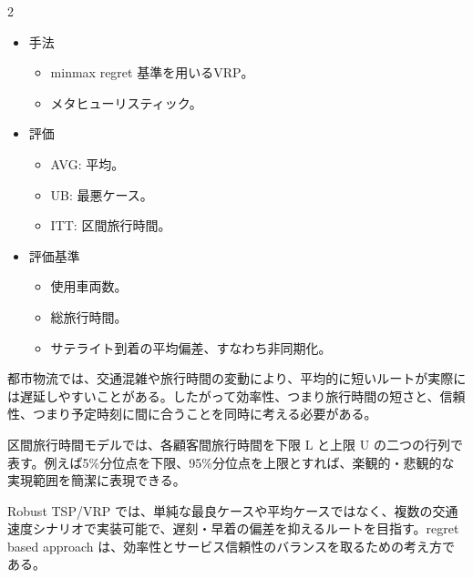 \clearpage



\vspace{1.5mm}

\begin{multicols}{2}

\footnotesize

\raggedcolumns


\begin{itemize}
\item 手法
\begin{itemize}
\item minmax regret 基準を用いるVRP。
\item メタヒューリスティック。
\end{itemize}
\item 評価
\begin{itemize}
\item AVG: 平均。
\item UB: 最悪ケース。
\item ITT: 区間旅行時間。
\end{itemize}
\item 評価基準
\begin{itemize}
\item 使用車両数。
\item 総旅行時間。
\item サテライト到着の平均偏差、すなわち非同期化。
\end{itemize}
\end{itemize}

都市物流では、交通混雑や旅行時間の変動により、平均的に短いルートが実際には遅延しやすいことがある。したがって効率性、つまり旅行時間の短さと、信頼性、つまり予定時刻に間に合うことを同時に考える必要がある。\par

区間旅行時間モデルでは、各顧客間旅行時間を下限 L と上限 U の二つの行列で表す。例えば5\%分位点を下限、95\%分位点を上限とすれば、楽観的・悲観的な実現範囲を簡潔に表現できる。\par

Robust TSP/VRP では、単純な最良ケースや平均ケースではなく、複数の交通速度シナリオで実装可能で、遅刻・早着の偏差を抑えるルートを目指す。regret based approach は、効率性とサービス信頼性のバランスを取るための考え方である。\par


\end{multicols}
